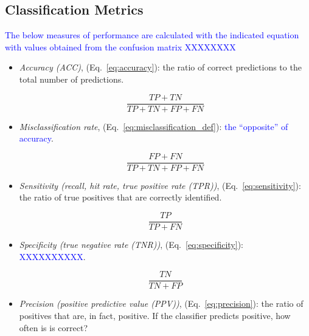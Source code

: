 \subsection{Classification Metrics}

\textcolor{blue}{The below measures of performance are calculated with the indicated equation with values obtained from the confusion matrix XXXXXXXX}

\begin{itemize}
	
\item \textit{Accuracy (ACC)}, (Eq.~\ref{eq:accuracy}): the ratio of correct predictions to the total number of predictions.

\begin{equation}
{\frac{TP+TN}{TP+TN+FP+FN}}
\label{eq:accuracy}
\end{equation}

\item \textit{Misclassification rate}, (Eq.~\ref{eq:misclassification_def}): \textcolor{blue}{the ``opposite'' of accuracy}.

\begin{equation}
{\frac{FP+FN}{TP+TN+FP+FN}}
\label{eq:misclassification_def}
\end{equation}


\item \textit{Sensitivity (recall, hit rate, true positive rate (TPR))}, (Eq.~\ref{eq:sensitivity}): the ratio of true positives that are correctly identified.

\begin{equation}
{\frac{TP}{TP+FN}}
\label{eq:sensitivity}
\end{equation}

\item \textit{Specificity (true negative rate (TNR))}, (Eq.~\ref{eq:specificity}): \textcolor{blue}{XXXXXXXXXX}.

\begin{equation}
{\frac{TN}{TN+FP}}
\label{eq:specificity}
\end{equation}

\item \textit{Precision (positive predictive value (PPV))}, (Eq.~\ref{eq:precision}): the ratio of positives that are, in fact, positive. If the classifier predicts positive, how often is is correct?


\end{itemize}
